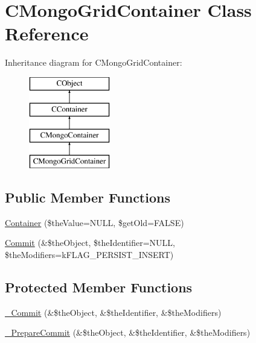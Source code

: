 \hypertarget{class_c_mongo_grid_container}{\section{C\-Mongo\-Grid\-Container Class Reference}
\label{class_c_mongo_grid_container}
}
Inheritance diagram for C\-Mongo\-Grid\-Container\-:\begin{figure}[H]
\begin{center}
\leavevmode
\includegraphics[height=4.000000cm]{class_c_mongo_grid_container}
\end{center}
\end{figure}
\subsection*{Public Member Functions}
\begin{DoxyCompactItemize}
\item 
\hyperlink{class_c_mongo_grid_container_aafde59c8f7bf042d0e4f3a8d7bc87d90}{Container} (\$the\-Value=N\-U\-L\-L, \$get\-Old=F\-A\-L\-S\-E)
\item 
\hyperlink{class_c_mongo_grid_container_a66b508afe83e1bc0dcfc2622a08aeebb}{Commit} (\&\$the\-Object, \$the\-Identifier=N\-U\-L\-L, \$the\-Modifiers=k\-F\-L\-A\-G\-\_\-\-P\-E\-R\-S\-I\-S\-T\-\_\-\-I\-N\-S\-E\-R\-T)
\end{DoxyCompactItemize}
\subsection*{Protected Member Functions}
\begin{DoxyCompactItemize}
\item 
\hyperlink{class_c_mongo_grid_container_a1dc8378e77df7c06afc2c733e2422482}{\-\_\-\-Commit} (\&\$the\-Object, \&\$the\-Identifier, \&\$the\-Modifiers)
\item 
\hyperlink{class_c_mongo_grid_container_a94715c26002c38020a8e4103d3075426}{\-\_\-\-Prepare\-Commit} (\&\$the\-Object, \&\$the\-Identifier, \&\$the\-Modifiers)
\end{DoxyCompactItemize}
